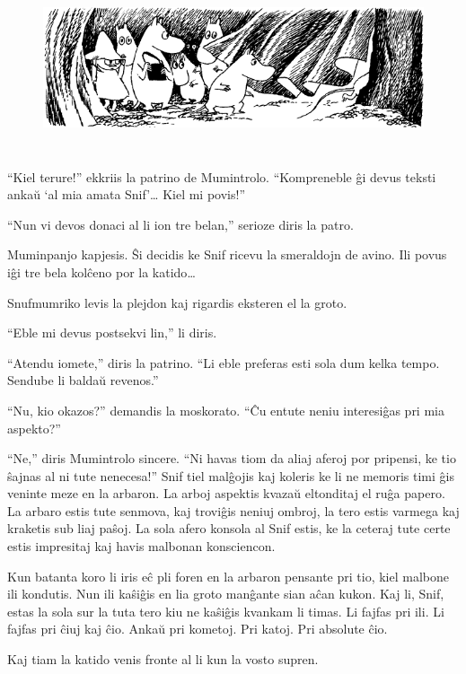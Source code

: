 \begin{figure}[htbp]
\centering
\includegraphics[width=450pt,height=141pt]{9-7.png}
\caption{}
\label{9-7}
\end{figure}

``Kiel terure!'' ekkriis la patrino de Mumintrolo. ``Kompreneble ĝi devus teksti ankaŭ `al mia amata Snif'{\ldots} Kiel mi povis!''

``Nun vi devos donaci al li ion tre belan,'' serioze diris la patro.

Muminpanjo kapjesis. Ŝi decidis ke Snif ricevu la smeraldojn de avino. Ili povus iĝi tre bela kolĉeno por la katido{\ldots}

Snufmumriko levis la plejdon kaj rigardis eksteren el la groto.

``Eble mi devus postsekvi lin,'' li diris.

``Atendu iomete,'' diris la patrino. ``Li eble preferas esti sola dum kelka tempo. Sendube li baldaŭ revenos.''

``Nu, kio okazos?'' demandis la moskorato. ``Ĉu entute neniu interesiĝas pri mia aspekto?''

``Ne,'' diris Mumintrolo sincere. ``Ni havas tiom da aliaj aferoj por pripensi, ke tio ŝajnas al ni tute nenecesa!''
\sectionbreak
Snif tiel malĝojis kaj koleris ke li ne memoris timi ĝis veninte meze en la arbaron. La arboj aspektis kvazaŭ eltonditaj el ruĝa papero. La arbaro estis tute senmova, kaj troviĝis neniuj ombroj, la tero estis varmega kaj kraketis sub liaj paŝoj. La sola afero konsola al Snif estis, ke la ceteraj tute certe estis impresitaj kaj havis malbonan konsciencon.

Kun batanta koro li iris eĉ pli foren en la arbaron pensante pri tio, kiel malbone ili kondutis. Nun ili kaŝiĝis en lia groto manĝante sian aĉan kukon. Kaj li, Snif, estas la sola sur la tuta tero kiu ne kaŝiĝis kvankam li timas. Li fajfas pri ili. Li fajfas pri ĉiuj kaj ĉio. Ankaŭ pri kometoj. Pri katoj. Pri absolute ĉio.

Kaj tiam la katido venis fronte al li kun la vosto supren.

